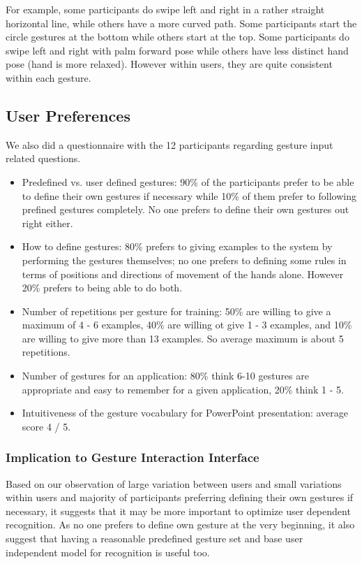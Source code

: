 \documentclass[conference]{IEEEtran}
\begin{document}
For example, some participants do swipe left and right in a rather straight
horizontal line, while others have a more curved path. Some participants start
the circle gestures at the bottom while others start at the top. Some
participants do swipe left and right with palm forward pose while others have
less distinct hand pose (hand is more relaxed). However within users, they are
quite consistent within each gesture. 

\subsection{User Preferences}
We also did a questionnaire with the 12 participants regarding gesture input
related questions. 

\begin{itemize}
  \item Predefined vs. user defined gestures: 90\% of the participants prefer to
  be able to define their own gestures if necessary while 10\% of them prefer to following prefined
gestures completely. No one prefers to define their own gestures out right either.
\item How to define gestures: 80\% prefers to giving examples to the system by
performing the gestures themselves; no one prefers to defining some rules in
terms of positions and directions of movement of the hands alone. However 20\%
prefers to being able to do both.
\item Number of repetitions per gesture for training: 50\% are willing to give a
maximum of 4 - 6 examples, 40\% are willing ot give 1 - 3 examples, and 10\% are
willing to give more than 13 examples. So average maximum is about 5
repetitions.
\item Number of gestures for an application: 80\% think 6-10 gestures are
appropriate and easy to remember for a given application, 20\% think 1 - 5.
\item Intuitiveness of the gesture vocabulary for PowerPoint presentation:
average score 4 / 5.
\end{itemize}

\subsubsection{Implication to Gesture Interaction Interface}
Based on our observation of large variation between users and small variations
within users and majority of participants preferring defining their own gestures
if necessary, it suggests that it may be more important to optimize user
dependent recognition. As no one prefers to define own gesture at the very
beginning, it also suggest that having a reasonable predefined gesture set and
base user independent model for recognition is useful too.
\end{document}
